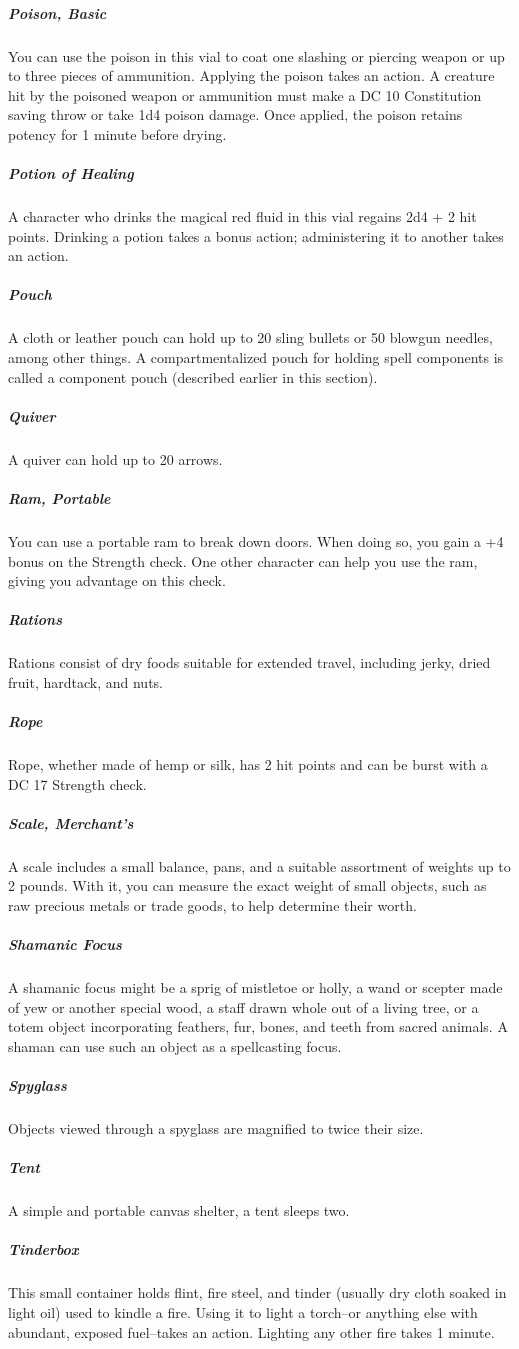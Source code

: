 \subparagraph*{Poison, Basic} You can use the poison in this vial to coat one slashing or piercing weapon or up to three pieces of ammunition. Applying the poison takes an action. A creature hit by the poisoned weapon or ammunition must make a DC 10 Constitution saving throw or take 1d4 poison damage. Once applied, the poison retains potency for 1 minute before drying.

\subparagraph*{Potion of Healing} A character who drinks the magical red fluid in this vial regains 2d4 + 2 hit points. Drinking a potion takes a bonus action; administering it to another takes an action.

\subparagraph*{Pouch} A cloth or leather pouch can hold up to 20 sling bullets or 50 blowgun needles, among other things. A compartmentalized pouch for holding spell components is called a component pouch (described earlier in this section). 

\subparagraph*{Quiver} A quiver can hold up to 20 arrows.

\subparagraph*{Ram, Portable} You can use a portable ram to break down doors. When doing so, you gain a +4 bonus on the Strength check. One other character can help you use the ram, giving you advantage on this check.

\subparagraph*{Rations} Rations consist of dry foods suitable for extended travel, including jerky, dried fruit, hardtack, and nuts.

\subparagraph*{Rope} Rope, whether made of hemp or silk, has 2 hit points and can be burst with a DC 17 Strength check.

\subparagraph*{Scale, Merchant's} A scale includes a small balance, pans, and a suitable assortment of weights up to 2 pounds. With it, you can measure the exact weight of small objects, such as raw precious metals or trade goods, to help determine their worth.

\subparagraph*{Shamanic Focus} A shamanic focus might be a sprig of mistletoe or holly, a wand or scepter made of yew or another special wood, a staff drawn whole out of a living tree, or a totem object incorporating feathers, fur, bones, and teeth from sacred animals. A shaman can use such an object as a spellcasting focus.

\subparagraph*{Spyglass} Objects viewed through a spyglass are magnified to twice their size.

\subparagraph*{Tent} A simple and portable canvas shelter, a tent sleeps two.

\subparagraph*{Tinderbox} This small container holds flint, fire steel, and tinder (usually dry cloth soaked in light oil) used to kindle a fire. Using it to light a torch--or anything else with abundant, exposed fuel--takes an action. Lighting any other fire takes 1 minute.

